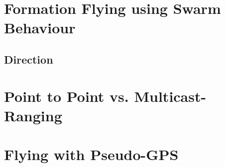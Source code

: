 \section{Formation Flying using Swarm Behaviour}
\subsection{Direction}

\section{Point to Point vs. Multicast-Ranging}

\section{Flying with Pseudo-GPS}
